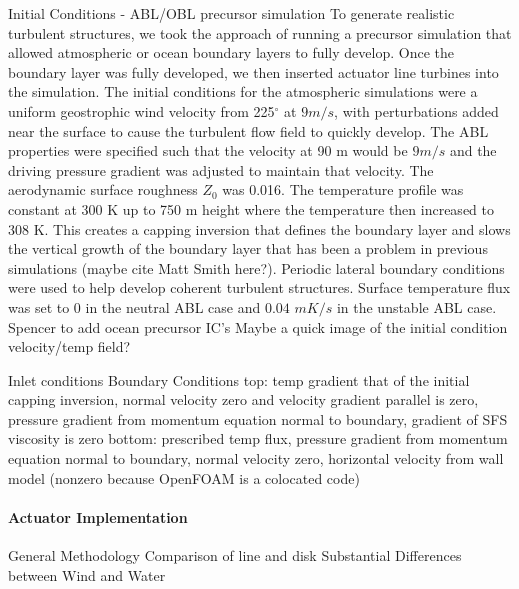 Initial Conditions - ABL/OBL precursor simulation
To generate realistic turbulent structures, we took the approach of running a precursor simulation that allowed atmospheric or ocean boundary layers to fully develop.  Once the boundary layer was fully developed, we then inserted actuator line turbines into the simulation.  The initial conditions for the atmospheric simulations were a uniform geostrophic wind velocity from 225$^\circ$  at $9 m/s$, with perturbations added near the surface to cause the turbulent flow field to quickly develop.  The ABL properties were specified such that the velocity at 90 m would be $9 m/s$ and the driving pressure gradient was adjusted to maintain that velocity.  The aerodynamic surface roughness $Z_{0}$ was 0.016.  The temperature profile was constant at 300 K up to 750 m height where the temperature then increased to 308 K.  This creates a capping inversion that defines the boundary layer and slows the vertical growth of the boundary layer that has been a problem in previous simulations (maybe cite Matt Smith here?).  Periodic lateral boundary conditions were used to help develop coherent turbulent structures.  Surface temperature flux was set to 0 in the neutral ABL case and $0.04$ $mK/s$ in the unstable ABL case.
%
Spencer to add ocean precursor IC's
Maybe a quick image of the initial condition velocity/temp field?

Inlet conditions
Boundary Conditions
top: temp gradient that of the initial capping inversion, normal velocity zero and velocity gradient parallel is zero, pressure gradient from momentum equation normal to boundary, gradient of SFS viscosity is zero
bottom: prescribed temp flux, pressure gradient from momentum equation normal to boundary, normal velocity zero, horizontal velocity from wall model (nonzero because OpenFOAM is a colocated code)

\paragraph{Actuator Implementation}

General Methodology
Comparison of line and disk
Substantial Differences between Wind and Water

